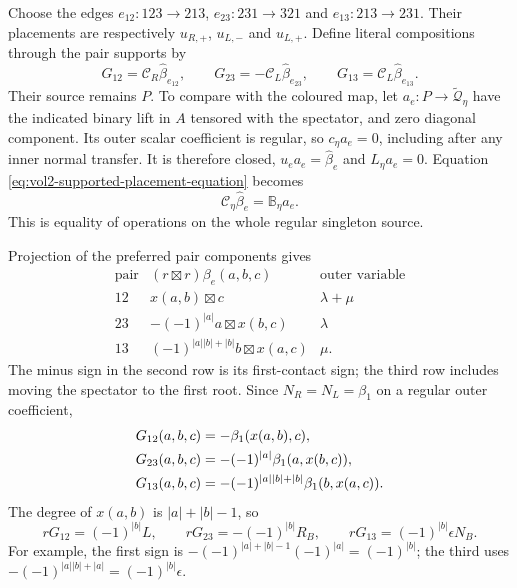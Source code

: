 Choose the edges
$e_{12}:123\to213$, $e_{23}:231\to321$ and
$e_{13}:213\to231$. Their placements are respectively
$u_{R,+}$, $u_{L,-}$ and $u_{L,+}$. Define literal compositions
through the pair supports by
\begin{equation}\label{eq:vol2-supported-iterated-maps}
 G_{12}=\mathcal C_R\widehat\beta_{e_{12}},\qquad
 G_{23}=-\mathcal C_L\widehat\beta_{e_{23}},\qquad
 G_{13}=\mathcal C_L\widehat\beta_{e_{13}}.
\end{equation}
Their source remains $P$. To compare with the coloured map,
let $a_e:P\to\widetilde{\mathcal Q}_\eta$ have the indicated
binary lift in $A$ tensored with the spectator, and zero
diagonal component. Its outer scalar coefficient is regular,
so $c_\eta a_e=0$, including after any inner normal transfer.
It is therefore closed, $u_ea_e=\widehat\beta_e$ and
$L_\eta a_e=0$. Equation
\eqref{eq:vol2-supported-placement-equation} becomes
\[
 \mathcal C_\eta\widehat\beta_e=\mathbb B_\eta a_e.
\]
This is equality of operations on the whole regular singleton
source.

Projection of the preferred pair components gives
\[
 \begin{array}{c|c|c}
 \text{pair}&(r\boxtimes r)\beta_e(a,b,c)&\text{outer variable}\\\hline
 12&x(a,b)\boxtimes c&\lambda+\mu\\
 23&-(-1)^{|a|}a\boxtimes x(b,c)&\lambda\\
 13&(-1)^{|a||b|+|b|}b\boxtimes x(a,c)&\mu.
 \end{array}
\]
The minus sign in the second row is its first-contact sign;
the third row includes moving the spectator to the first root.
Since $N_R=N_L=\beta_1$ on a regular outer coefficient,
\begin{align}\label{eq:vol2-supported-tree-formulas}
 G_{12}(a,b,c)&=-\beta_1(x(a,b),c),\notag\\
 G_{23}(a,b,c)&=-(-1)^{|a|}\beta_1(a,x(b,c)),\\
 G_{13}(a,b,c)&=-(-1)^{|a||b|+|b|}\beta_1(b,x(a,c)).\notag
\end{align}
The degree of $x(a,b)$ is $|a|+|b|-1$, so
\begin{equation}\label{eq:vol2-supported-channel-projections}
 rG_{12}=(-1)^{|b|}L,
 \qquad rG_{23}=-(-1)^{|b|}R_B,
 \qquad rG_{13}=(-1)^{|b|}\epsilon N_B.
\end{equation}
For example, the first sign is
$-(-1)^{|a|+|b|-1}(-1)^{|a|}=(-1)^{|b|}$;
the third uses
$-(-1)^{|a||b|+|a|}=(-1)^{|b|}\epsilon$.

